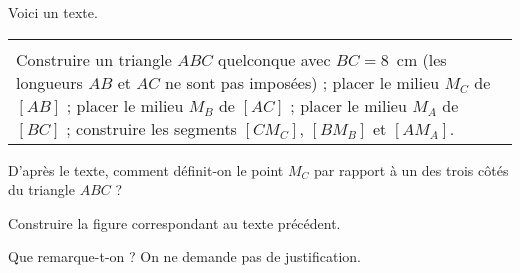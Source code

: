 Voici un texte.\\

\begin{tabularx}{\textwidth}{|X|}
\hline\\
Construire un triangle $ABC$ quelconque avec $BC = 8$~cm (les
longueurs $AB$ et $AC$ ne sont pas imposées) ; placer le milieu
$M_C$ de $[AB]$ ; placer le milieu $M_B$ de $[AC]$ ; placer le
milieu $M_A$ de $[BC]$ ; construire les segments $[CM_C]$,
$[BM_B]$ et $[AM_A]$.

\\
\hline
\end{tabularx}

\vskip 0.4cm

\begin{myenumerate}
    \item D'après le texte, comment définit-on le point $M_C$ par
    rapport à un des trois côtés du triangle $ABC$ ?
    \item Construire la figure correspondant au texte précédent.
    \item Que remarque-t-on ? On ne demande pas de justification.
\end{myenumerate}